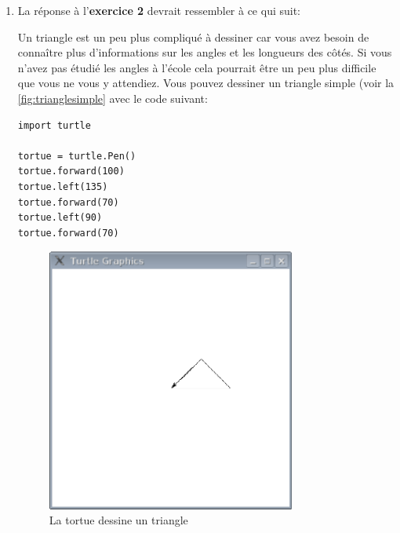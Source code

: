 \begin{enumerate}
\item La réponse à l'\textbf{exercice 2} devrait ressembler à ce qui suit:

Un triangle est un peu plus compliqué à dessiner car vous avez besoin de connaître plus d'informations sur les angles et les longueurs des côtés. Si vous n'avez pas étudié les angles à l'école cela pourrait être un peu plus difficile que vous ne vous y attendiez. Vous pouvez dessiner un triangle simple (voir la \autoref{fig:trianglesimple} avec le code suivant:

\begin{Verbatim}[frame=single,rulecolor=\color{mbleu}, label=à taper]
import turtle

tortue = turtle.Pen()
tortue.forward(100)
tortue.left(135)
tortue.forward(70)
tortue.left(90)
tortue.forward(70)
\end{Verbatim}

\begin{figure}[!ht]
\begin{center}
\includegraphics[width=82mm]{images/trianglesimple.eps}
\end{center}
\caption{La tortue dessine un triangle}\label{fig:trianglesimple}
\end{figure}

\end{enumerate}


